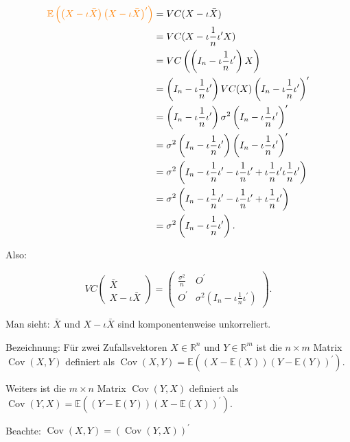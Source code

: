 \documentclass{tstextbook}
\DeclareMathOperator{\Cov}{Cov}
\begin{document}
\begin{example}
\begin{align*}
	\textcolor{orange}{\mathbb{E}\left(\left(X-\iota\bar{X}\right)\left(X-\iota\bar{X}\right)^{\prime}\right)} & =VC(X-\iota\bar{X})\\
	& =VC(X-\iota\frac{1}{n}\iota^{\prime}X)\\
	& =VC\left(\left(I_{n}-\iota\frac{1}{n}\iota^{\prime}\right)X\right)\\
	& =\left(I_{n}-\iota\frac{1}{n}\iota^{\prime}\right)VC(X)\left(I_{n}-\iota\frac{1}{n}\iota^{\prime}\right)^{\prime}\\
	& =\left(I_{n}-\iota\frac{1}{n}\iota^{\prime}\right)\sigma^{2}\left(I_{n}-\iota\frac{1}{n}\iota^{\prime}\right)^{\prime}\\
	& =\sigma^{2}\left(I_{n}-\iota\frac{1}{n}\iota^{\prime}\right)\left(I_{n}-\iota\frac{1}{n}\iota^{\prime}\right)^{\prime}\\
	& =\sigma^{2}\left(I_{n}-\iota\frac{1}{n}\iota^{\prime}-\iota\frac{1}{n}\iota^{\prime}+\iota\frac{1}{n}\iota^{\prime}\iota\frac{1}{n}\iota^{\prime}\right)\\
	& =\sigma^{2}\left(I_{n}-\iota\frac{1}{n}\iota^{\prime}-\iota\frac{1}{n}\iota^{\prime}+\iota\frac{1}{n}\iota^{\prime}\right)\\
	& =\sigma^{2}\left(I_{n}-\iota\frac{1}{n}\iota^{\prime}\right).
\end{align*}

Also:

\[
VC\begin{pmatrix}
	\bar{X} \\ X-\iota\bar{X}
\end{pmatrix}=\begin{pmatrix}\frac{\sigma^{2}}{n} & O^{\prime}\\
	O^{\prime} & \sigma^{2}\left(I_{n}-\iota\frac{1}{n}\iota^{\prime}\right)
\end{pmatrix}.
\]

Man sieht: $ \bar{X} $ und $ X-\iota\bar{X} $ sind komponentenweise unkorreliert.

\end{example}

\begin{remark}
	Bezeichnung:
Für zwei Zufallsvektoren $ X\in\mathbb{R}^n $ und $ Y\in\mathbb{R}^m $ ist die $ n\times m $ Matrix $ \Cov(X,Y) $ definiert als $ \Cov(X,Y)=\mathbb{E}((X-\mathbb{E}(X))(Y-\mathbb{E}(Y))^\prime). $

Weiters ist die $ m\times n $ Matrix $ \Cov(Y,X) $ definiert als $ \Cov(Y,X)=\mathbb{E}((Y-\mathbb{E}(Y))(X-\mathbb{E}(X))^\prime). $

Beachte: $ \Cov(X,Y) = (\Cov(Y,X))^\prime $
\end{remark}
\end{document}

